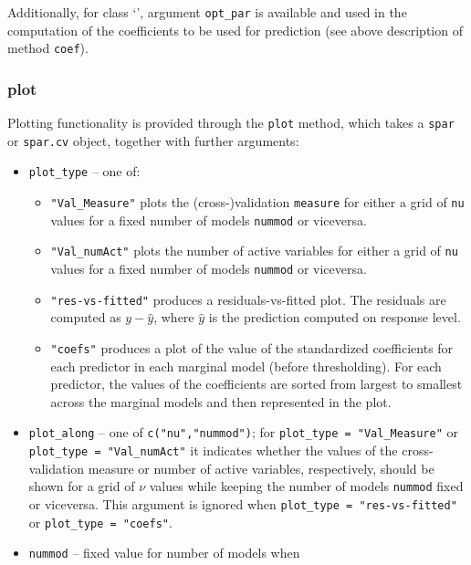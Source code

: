 \documentclass[
  article]{jss}
\newcommand{\class}[1]{`\code{#1}'}
\begin{document}
Additionally, for class \class{spar.cv}, argument \texttt{opt\_par} is
available and used in the computation of the coefficients to be used for
prediction (see above description of method \texttt{coef}).

\subsubsection{plot}\label{plot}

Plotting functionality is provided through the \texttt{plot} method,
which takes a \texttt{spar} or \texttt{spar.cv} object, together with
further arguments:

\begin{itemize}
\item
  \texttt{plot\_type} -- one of:

  \begin{itemize}
  \item
    \texttt{"Val\_Measure"} plots the (cross-)validation
    \texttt{measure} for either a grid of \texttt{nu} values for a fixed
    number of models \texttt{nummod} or viceversa.
  \item
    \texttt{"Val\_numAct"} plots the number of active variables for
    either a grid of \texttt{nu} values for a fixed number of models
    \texttt{nummod} or viceversa.
  \item
    \texttt{"res-vs-fitted"} produces a residuals-vs-fitted plot. The
    residuals are computed as \(y- \widehat y\), where \(\widehat y\) is
    the prediction computed on response level.
  \item
    \texttt{"coefs"} produces a plot of the value of the standardized
    coefficients for each predictor in each marginal model (before
    thresholding). For each predictor, the values of the coefficients
    are sorted from largest to smallest across the marginal models and
    then represented in the plot.
  \end{itemize}
\item
  \texttt{plot\_along} -- one of \texttt{c("nu","nummod")}; for
  \texttt{plot\_type\ =\ "Val\_Measure"} or
  \texttt{plot\_type\ =\ "Val\_numAct"} it indicates whether the values
  of the cross-validation measure or number of active variables,
  respectively, should be shown for a grid of \(\nu\) values while
  keeping the number of models \texttt{nummod} fixed or viceversa. This
  argument is ignored when \texttt{plot\_type\ =\ "res-vs-fitted"} or
  \texttt{plot\_type\ =\ "coefs"}.
\item
  \texttt{nummod} -- fixed value for number of models when

\end{itemize}
\end{document}
